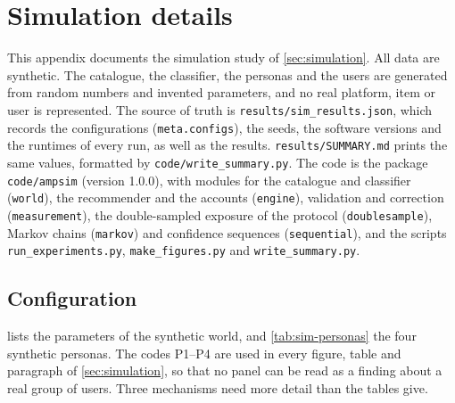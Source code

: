 \providecommand{\simfit}[1]{\resizebox{\ifdim\width>\linewidth\linewidth\else\width\fi}{!}{#1}}
\providecommand{\Sp}{\mathrm{Sp}}
\providecommand{\Se}{\mathrm{Se}}
\section{Simulation details}\label{app:simdetails}

This appendix documents the simulation study of \cref{sec:simulation}. All data are synthetic. The catalogue, the classifier, the personas and the users are generated from random numbers and invented parameters, and no real platform, item or user is represented. The source of truth is \texttt{results/sim\_results.json}, which records the configurations (\texttt{meta.configs}), the seeds, the software versions and the runtimes of every run, as well as the results. \texttt{results/SUMMARY.md} prints the same values, formatted by \texttt{code/write\_summary.py}. The code is the package \texttt{code/ampsim} (version 1.0.0), with modules for the catalogue and classifier (\texttt{world}), the recommender and the accounts (\texttt{engine}), validation and correction (\texttt{measurement}), the double-sampled exposure of the protocol (\texttt{doublesample}), Markov chains (\texttt{markov}) and confidence sequences (\texttt{sequential}), and the scripts \texttt{run\_experiments.py}, \texttt{make\_figures.py} and \texttt{write\_summary.py}.

\subsection{Configuration}\label{app:sim-config}

 lists the parameters of the synthetic world, and \cref{tab:sim-personas} the four synthetic personas. The codes P1--P4 are used in every figure, table and paragraph of \cref{sec:simulation}, so that no panel can be read as a finding about a real group of users. Three mechanisms need more detail than the tables give.

